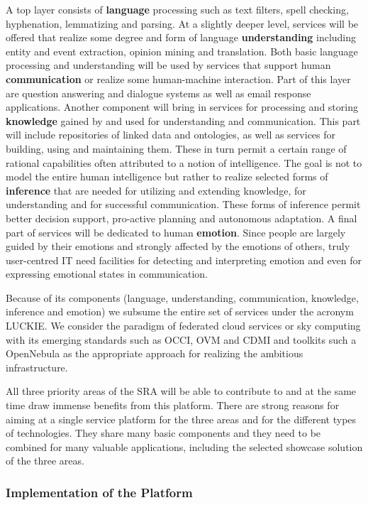 \documentclass[10pt, plain]{../../metanetpaper}
\begin{document}
\begin{multicols}{2}
A top layer consists of \textbf{language} processing such as text filters, spell checking, hyphenation, lemmatizing and parsing. At a slightly deeper level, services will be offered that realize some degree and form of language \textbf{understanding} including entity and event extraction, opinion mining and translation. Both basic language processing and understanding will be used by services that support human \textbf{communication} or realize some human-machine interaction. Part of this layer are question answering and dialogue systems as well as email response applications. Another component will bring in services for processing and storing \textbf{knowledge} gained by and used for understanding and communication. This part will include repositories of linked data and ontologies, as well as services for building, using and maintaining them. These in turn permit a certain range of rational capabilities often attributed to a notion of intelligence. The goal is not to model the entire human intelligence but rather to realize selected forms of \textbf{inference} that are needed for utilizing and extending knowledge, for understanding and for successful communication. These forms of inference permit better decision support, pro-active planning and autonomous adaptation. A final part of services will be dedicated to human \textbf{emotion}.  Since people are largely guided by their emotions and strongly affected by the emotions of others, truly user-centred IT need facilities for detecting and interpreting emotion and even for expressing emotional states in communication.
 
Because of its components (language, understanding, communi­cation, know­ledge, inference and emotion) we subsume the entire set of services under the acronym LUCKIE.  We consider the paradigm of federated cloud services or sky computing with its emerging standards such as OCCI, OVM and CDMI and toolkits such a OpenNebula as the appropriate approach for realizing the ambitious infrastructure.  
 
All three priority areas of the SRA will be able to contribute to and at the same time draw immense benefits from this platform. There are strong reasons for aiming at a single service platform for the three areas and for the different types of technologies. They share many basic components and they need to be combined for many valuable applications, including the selected showcase solution of the three areas.

\subsubsection{Implementation of the Platform}
\label{sec:implementation-of-platform}


\end{multicols}
\end{document}
